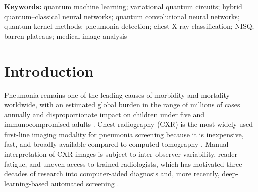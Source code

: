 \documentclass[11pt,a4paper]{article}
\begin{document}
\begin{abstract}
literature, and ground a discussion of the algorithmic trade-offs, evaluation
methodology, and open problems---including state-preparation overhead, barren
plateaus, dataset shift, and the absence, at present circuit scales, of a
demonstrated computational quantum advantage.  Finally, we report the
execution of the trained circuit on a physical IBM~Quantum processor and
quantify the simulator-to-hardware gap.  On a class-balanced subset, hardware
noise compresses the span of the predicted pneumonia probability by
59\% relative to the noise-free statevector simulator (0.439 $\rightarrow$
0.182); we attribute this primarily to the 62 two-qubit gates required for
amplitude-encoding state preparation rather than to the 18 gates of the learned
ansatz, which accounts for under a quarter of the circuit's two-qubit budget.
Zero-noise extrapolation restores the distributional span but not the
sample-level agreement with the simulator, indicating that error mitigation at
this circuit scale mitigates variance at the cost of additional bias.
\end{abstract}

\noindent\textbf{Keywords:} quantum machine learning; variational quantum
circuits; hybrid quantum--classical neural networks; quantum convolutional
neural networks; quantum kernel methods; pneumonia detection; chest X-ray
classification; NISQ; barren plateaus; medical image analysis

\section{Introduction}
\label{sec:intro}

Pneumonia remains one of the leading causes of morbidity and mortality
worldwide, with an estimated global burden in the range of millions of cases
annually and disproportionate impact on children under five and
immunocompromised adults \cite{cdc2025,iqwig2021}.  Chest radiography (CXR)
is the most widely used first-line imaging modality for pneumonia screening
because it is inexpensive, fast, and broadly available compared to computed
tomography \cite{iqwig2021}.  Manual interpretation of CXR images is subject
to inter-observer variability, reader fatigue, and uneven access to trained
radiologists, which has motivated three decades of research into
computer-aided diagnosis and, more recently, deep-learning-based automated
screening \cite{naz2020,kundu2021}.
\end{document}
